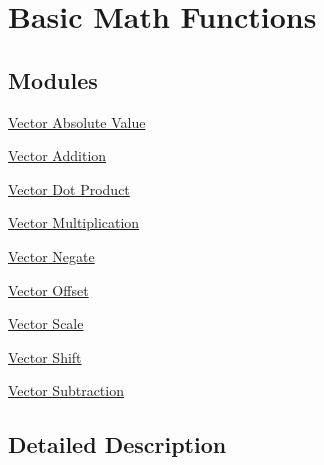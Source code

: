 \hypertarget{group__group_math}{\section{Basic Math Functions}
\label{group__group_math}
}
\subsection*{Modules}
\begin{DoxyCompactItemize}
\item 
\hyperlink{group___basic_abs}{Vector Absolute Value}
\item 
\hyperlink{group___basic_add}{Vector Addition}
\item 
\hyperlink{group__dot__prod}{Vector Dot Product}
\item 
\hyperlink{group___basic_mult}{Vector Multiplication}
\item 
\hyperlink{group__negate}{Vector Negate}
\item 
\hyperlink{group__offset}{Vector Offset}
\item 
\hyperlink{group__scale}{Vector Scale}
\item 
\hyperlink{group__shift}{Vector Shift}
\item 
\hyperlink{group___basic_sub}{Vector Subtraction}
\end{DoxyCompactItemize}


\subsection{Detailed Description}
